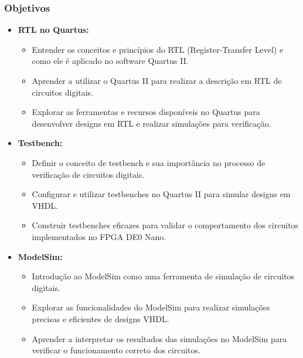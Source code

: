 \documentclass{CPSPresentation}
\begin{document}
\begin{frame}
	\frametitle{Objetivos}
	
\begin{itemize}
	\item \textbf{RTL no Quartus:}
	\begin{itemize}
		\item Entender os conceitos e princípios do RTL (Register-Transfer Level) e como ele é aplicado no software Quartus II.
		\item Aprender a utilizar o Quartus II para realizar a descrição em RTL de circuitos digitais.
		\item Explorar as ferramentas e recursos disponíveis no Quartus para desenvolver designs em RTL e realizar simulações para verificação.
	\end{itemize}
	
\item \textbf{Testbench:}
\begin{itemize}
	\item Definir o conceito de testbench e sua importância no processo de verificação de circuitos digitais.
	\item Configurar e utilizar testbenches no Quartus II para simular designs em VHDL.
	\item Construir testbenches eficazes para validar o comportamento dos circuitos implementados no FPGA DE0 Nano.
\end{itemize}

\item \textbf{ModelSim:}
\begin{itemize}
	\item Introdução ao ModelSim como uma ferramenta de simulação de circuitos digitais.
	\item Explorar as funcionalidades do ModelSim para realizar simulações precisas e eficientes de designs VHDL.
	\item Aprender a interpretar os resultados das simulações no ModelSim para verificar o funcionamento correto dos circuitos.
\end{itemize}	
	
	
\end{itemize}
	
	
	
	
\end{frame}
\end{document}
